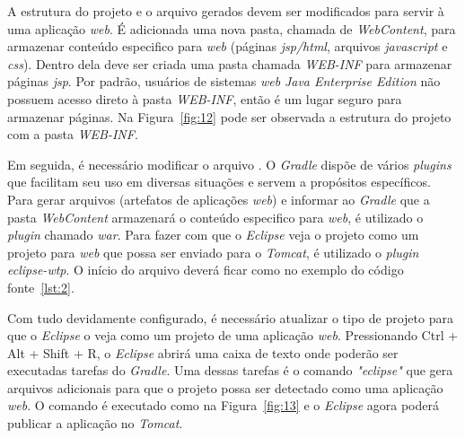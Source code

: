 
A estrutura do projeto e o arquivo  gerados devem ser modificados para servir à uma aplicação \textit{web}. É adicionada uma nova pasta, chamada de \textit{WebContent}, para armazenar conteúdo especifico para \textit{web} (páginas \textit{jsp/html}, arquivos \textit{javascript} e \textit{css}). Dentro dela deve ser criada uma pasta chamada \textit{WEB-INF} para armazenar páginas \textit{jsp}. Por padrão, usuários de sistemas \textit{web} \textit{Java Enterprise Edition} não possuem acesso direto à pasta \textit{WEB-INF}, então é um lugar seguro para armazenar páginas. Na Figura~\ref{fig:12} pode ser observada a estrutura do projeto com a pasta \textit{WEB-INF}.


Em seguida, é necessário modificar o arquivo . O \textit{Gradle} dispõe de vários \textit{plugins} que facilitam seu uso em diversas situações e servem a propósitos específicos. Para gerar arquivos  (artefatos de aplicações \textit{web}) e informar ao \textit{Gradle} que a pasta \textit{WebContent} armazenará o conteúdo especifico para \textit{web}, é utilizado o \textit{plugin} chamado \textit{war}. Para fazer com que o \textit{Eclipse} veja o projeto como um projeto para \textit{web} que possa ser enviado para o \textit{Tomcat}, é utilizado o \textit{plugin} \textit{eclipse-wtp}. O início do arquivo  deverá ficar como no exemplo do código fonte~\ref{lst:2}.


Com tudo devidamente configurado, é necessário atualizar o tipo de projeto para que o \textit{Eclipse} o veja como um projeto de uma aplicação \textit{web}. Pressionando Ctrl + Alt + Shift + R, o \textit{Eclipse} abrirá uma caixa de texto onde poderão ser executadas tarefas do \textit{Gradle}. Uma dessas tarefas é o comando \textit{"eclipse"} que gera arquivos adicionais para que o projeto possa ser detectado como uma aplicação \textit{web}. O comando é executado como na Figura~\ref{fig:13} e o \textit{Eclipse} agora poderá publicar a aplicação no \textit{Tomcat}.


